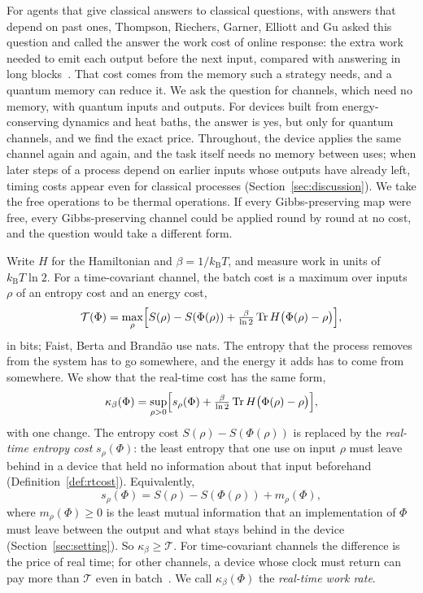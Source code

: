 \documentclass[11pt]{article}
\theoremstyle{definition}
\theoremstyle{remark}
\newcommand{\Tr}{\operatorname{Tr}}
\newcommand{\kB}{k_{\mathrm B}}
\newcommand{\Tcap}{\mathcal T}
\newcommand{\Trt}{\kappa_\beta}
\begin{document}
For agents that give classical answers to classical questions, with answers that depend on past ones, Thompson, Riechers, Garner, Elliott and Gu asked this question and called the answer the work cost of online response: the extra work needed to emit each output before the next input, compared with answering in long blocks~\cite{Thompson25}. That cost comes from the memory such a strategy needs, and a quantum memory can reduce it. We ask the question for channels, which need no memory, with quantum inputs and outputs. For devices built from energy-conserving dynamics and heat baths, the answer is yes, but only for quantum channels, and we find the exact price. Throughout, the device applies the same channel again and again, and the task itself needs no memory between uses; when later steps of a process depend on earlier inputs whose outputs have already left, timing costs appear even for classical processes (Section~\ref{sec:discussion}). We take the free operations to be thermal operations. If every Gibbs-preserving map were free, every Gibbs-preserving channel could be applied round by round at no cost, and the question would take a different form.

Write $H$ for the Hamiltonian and $\beta=1/\kB T$, and measure work in units of $\kB T\ln2$. For a time-covariant channel, the batch cost is a maximum over inputs $\rho$ of an entropy cost and an energy cost,
\begin{equation}\label{eq:batch}
  \Tcap(\Phi)=\max_\rho\Bigl[S(\rho)-S(\Phi(\rho))+\tfrac{\beta}{\ln 2}\Tr H\bigl(\Phi(\rho)-\rho\bigr)\Bigr],
\end{equation}
in bits; Faist, Berta and Brand\~ao use nats. The entropy that the process removes from the system has to go somewhere, and the energy it adds has to come from somewhere. We show that the real-time cost has the same form,
\begin{equation}\label{eq:realtime}
  \Trt(\Phi)=\sup_{\rho>0}\Bigl[s_\rho(\Phi)+\tfrac{\beta}{\ln 2}\Tr H\bigl(\Phi(\rho)-\rho\bigr)\Bigr],
\end{equation}
with one change. The entropy cost $S(\rho)-S(\Phi(\rho))$ is replaced by the \emph{real-time entropy cost} $s_\rho(\Phi)$: the least entropy that one use on input $\rho$ must leave behind in a device that held no information about that input beforehand (Definition~\ref{def:rtcost}). Equivalently,
\begin{equation}\label{eq:mutual}
  s_\rho(\Phi)=S(\rho)-S(\Phi(\rho))+m_\rho(\Phi),
\end{equation}
where $m_\rho(\Phi)\ge0$ is the least mutual information that an implementation of $\Phi$ must leave between the output and what stays behind in the device (Section~\ref{sec:setting}). So $\Trt\ge\Tcap$. For time-covariant channels the difference is the price of real time; for other channels, a device whose clock must return can pay more than $\Tcap$ even in batch~\cite{KeepingTime}. We call $\Trt(\Phi)$ the \emph{real-time work rate}.
\end{document}
